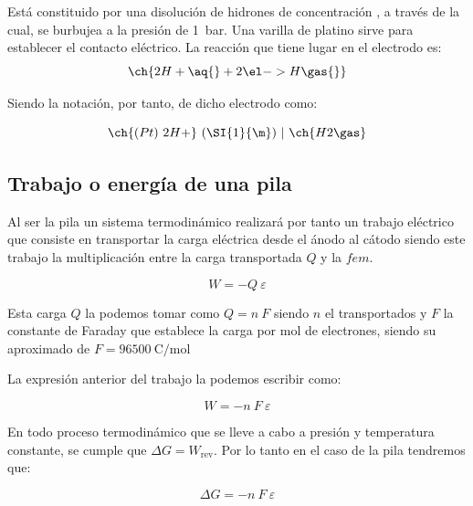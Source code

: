     Está constituido por una disolución de hidrones de concentración , a través de la cual, se burbujea  a la presión de \SI{1}{\bar}.
    Una varilla de platino sirve para establecer el contacto eléctrico.
    La reacción que tiene lugar en el electrodo es:
    \begin{equation*}
        \ch{2 H+ \aq{} + 2 \el -> H \gas{}}
    \end{equation*}

    Siendo la notación, por tanto, de dicho electrodo como:

    \begin{equation*}
        \ch{(Pt)\ 2 H+ } \ (\SI{1}{\m})\ | \ \ch{H2 \gas}
    \end{equation*}

    \subsection{Trabajo o energía de una pila}\label{subsec:trabajo-o-energia-de-una-pila}

    Al ser la pila un sistema termodinámico realizará por tanto un trabajo eléctrico que consiste en transportar la carga eléctrica desde el ánodo al cátodo siendo este trabajo la multiplicación entre la carga transportada \(Q\) y la \(fem\).

    \begin{equation*}
        W = -Q\ \varepsilon
    \end{equation*}

    Esta carga \(Q\) la podemos tomar como \(Q = n\ F\) siendo \(n\) el  transportados y \(F\) la constante de Faraday que establece la carga por mol de electrones, siendo su aproximado de \(F = \SI{96500}{\coulomb\per\mol}\)

    La expresión anterior del trabajo la podemos escribir como:

    \begin{equation}
        W = -n\ F\ \varepsilon
        \label{eq:trabajo-fuerza-electromotriz}
    \end{equation}

    En todo proceso termodinámico que se lleve a cabo a presión y temperatura constante, se cumple que \(\Delta G  = W_{\text{rev}} \).
    Por lo tanto en el caso de la pila tendremos que:

    \begin{equation}
        \Delta G = -n\ F\ \varepsilon
        \label{eq:energia-libre-giibs-fuerza-electromotriz}
    \end{equation}

